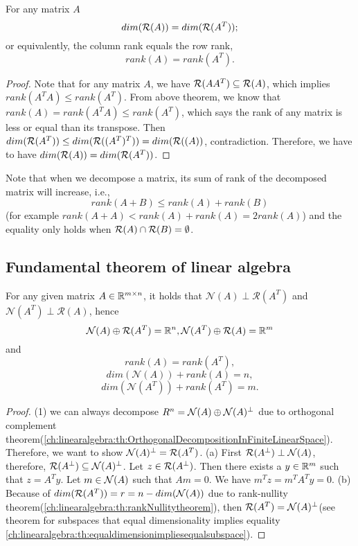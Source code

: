 \begin{refsection}
\begin{theorem}\label{ch:linearalgebra:th:fundamentalTheoremOfRanks}
	\cite[132]{banerjee2014linear} For any matrix $A$
	$$dim(\mathcal{R}(A)) = dim(\mathcal{R}(A^T));$$
	or equivalently, the column rank equals the row rank,
	$$rank(A) = rank(A^T).$$
\end{theorem}
\begin{proof}
	Note that for any matrix $A$, we have $\mathcal{R}(AA^T) \subseteq \mathcal{R}(A)$, which implies $rank(A^TA) \leq rank(A^T)$. From above theorem, we know that $rank(A) = rank(A^TA) \leq rank(A^T)$, which says the rank of any matrix is less or equal than its transpose. Then $dim(\mathcal{R}(A^T)) \leq dim(\mathcal{R}((A^T)^T)) = dim(\mathcal{R}((A))$, contradiction. Therefore, we have to have $dim(\mathcal{R}(A)) = dim(\mathcal{R}(A^T))$.
\end{proof}



\begin{remark}
	Note that when we decompose a matrix, its sum of rank of the decomposed matrix will increase, i.e., 
	$$rank(A + B) \leq rank(A) + rank(B)$$
	(for example $rank(A+A) < rank(A) +rank(A) = 2rank(A)$)
	and the equality only holds when $\mathcal{R}(A)\cap \mathcal{R}(B) = \emptyset$. 
\end{remark}


\subsection{Fundamental theorem of linear algebra}
\begin{theorem}
	\cite{calafiore2014optimization}\cite[178]{meyer2000matrix}\label{ch:linearalgebra:th:fundamentalTheoremOfAlgebra}For any given matrix $A \in \mathbb{R}^{m\times n}$, it holds that $\mathcal{N}(A)\perp \mathcal{R}(A^T)$ and $\mathcal{N}(A^T)\perp \mathcal{R}(A)$, hence
	$$\mathcal{N}(A) \oplus \mathcal{R}(A^T) =\mathbb{R}^n, \mathcal{N}(A^T)\oplus \mathcal{R}(A) = \mathbb{R}^m$$
	and
	$$rank(A) = rank(A^T),$$
	$$dim(\mathcal{N}(A)) + rank(A) = n,$$
	$$dim(\mathcal{N}(A^T)) + rank(A^T) = m.$$
\end{theorem}

\begin{proof}
(1)	we can always decompose $R^n = \mathcal{N}(A) \oplus \mathcal{N}(A)^{\perp}$ due to orthogonal complement theorem(\autoref{ch:linearalgebra:th:OrthogonalDecompositionInFiniteLinearSpace}). Therefore, we want to show $\mathcal{N}(A)^{\perp} = \mathcal{R}(A^T)$.
(a) First $\mathcal{R}(A^\perp) \perp \mathcal{N}(A)$, therefore, $\mathcal{R}(A^\perp) \subseteq \mathcal{N}(A)^\perp$. Let $z \in \mathcal{R}(A^\perp)$. Then there exists a $y\in \mathbb{R}^m$ such that $z = A^Ty$. Let $m\in \mathcal{N}(A)$ such that $Am = 0$. We have $m^Tz = m^TA^Ty = 0$.
(b) Because of $dim(\mathcal{R}(A^T)) =  r = n - dim(\mathcal{N}(A))$ due to rank-nullity theorem(\autoref{ch:linearalgebra:th:rankNullitytheorem}), then 
	$\mathcal{R}(A^T) = \mathcal{N}(A)^{\perp}$(see theorem for subspaces that equal dimensionality implies equality \autoref{ch:linearalgebra:th:equaldimensionimpliesequalsubspace}). 


\end{proof}
\end{refsection}
